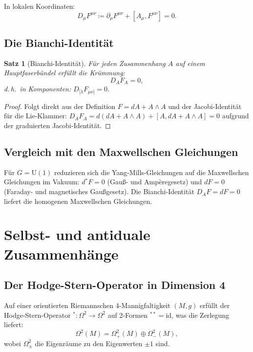 \documentclass[12pt,a4paper]{amsart}
\newtheorem{theorem}{Satz}[section]
\theoremstyle{definition}
\theoremstyle{remark}
\begin{document}
In lokalen Koordinaten:
\[
  D_\mu F^{\mu\nu} \coloneqq \partial_\mu F^{\mu\nu} + [A_\mu, F^{\mu\nu}] = 0.
\]

\subsection{Die Bianchi-Identität}

\begin{theorem}[Bianchi-Identität]
Für jeden Zusammenhang $A$ auf einem Hauptfaserbündel erfüllt die Krümmung:
\[
  D_A F_A = 0,
\]
d.\,h.\ in Komponenten: $D_{[\lambda} F_{\mu\nu]} = 0$.
\end{theorem}

\begin{proof}
Folgt direkt aus der Definition $F = dA + A \wedge A$ und der Jacobi-Identität für
die Lie-Klammer: $D_A F_A = d(dA + A \wedge A) + [A, dA + A \wedge A] = 0$ aufgrund
der graduierten Jacobi-Identität.
\end{proof}

\subsection{Vergleich mit den Maxwellschen Gleichungen}

Für $G = \mathrm{U}(1)$ reduzieren sich die Yang-Mills-Gleichungen auf die Maxwellschen
Gleichungen im Vakuum: $d{}^* F = 0$ (Gauß- und Ampèregesetz) und $dF = 0$
(Faraday- und magnetisches Gaußgesetz). Die Bianchi-Identität $D_A F = dF = 0$ liefert
die homogenen Maxwellschen Gleichungen.

\section{Selbst- und antiduale Zusammenhänge}
\label{sec:dual}

\subsection{Der Hodge-Stern-Operator in Dimension 4}

Auf einer orientierten Riemannschen 4-Mannigfaltigkeit $(M, g)$ erfüllt der
Hodge-Stern-Operator ${}^*: \Omega^2 \to \Omega^2$ auf 2-Formen ${}^{**} = \mathrm{id}$,
was die Zerlegung liefert:
\[
  \Omega^2(M) = \Omega^2_+(M) \oplus \Omega^2_-(M),
\]
wobei $\Omega^2_\pm$ die Eigenräume zu den Eigenwerten $\pm 1$ sind.
\end{document}
